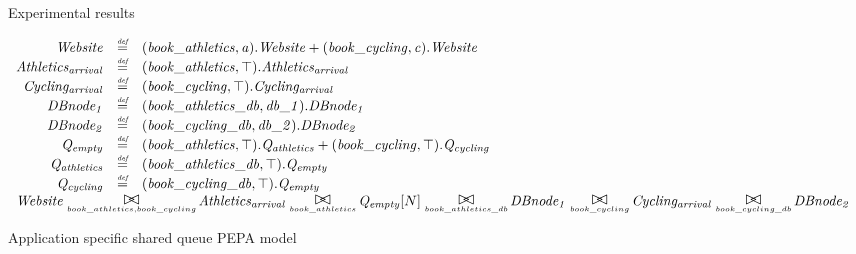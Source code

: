 \begin{figure}
	\caption{Experimental results}
	\centering
\end{figure}

\begin{figure}
	\caption{Application specific shared queue PEPA model}
	\centering
	\begin{displaymath}
	\begin{array}{rcl}
	\mathit{Website} & \rmdef & (\mathit{book\_athletics},\mathit{a}).\mathit{Website}+(\mathit{book\_cycling},\mathit{c}).\mathit{Website}\\
	\mathit{Athletics_{arrival}} & \rmdef & (\mathit{book\_athletics},\top).\mathit{Athletics_{arrival}}\\
	\mathit{Cycling_{arrival}} & \rmdef & (\mathit{book\_cycling},\top).\mathit{Cycling_{arrival}}\\
	\mathit{DBnode_1} & \rmdef & (\mathit{book\_athletics\_db},\mathit{db\_1}).\mathit{DBnode_1}\\
	\mathit{DBnode_2} & \rmdef & (\mathit{book\_cycling\_db},\mathit{db\_2}).\mathit{DBnode_2}\\
	\mathit{Q_{empty}} & \rmdef & (\mathit{book\_athletics},\top).\mathit{Q_{athletics}}+(\mathit{book\_cycling},\top).\mathit{Q_{cycling}}\\
	\mathit{Q_{athletics}} & \rmdef & (\mathit{book\_athletics\_db},\top).\mathit{Q_{empty}}\\
	\mathit{Q_{cycling}} & \rmdef & (\mathit{book\_cycling\_db},\top).\mathit{Q_{empty}}\\
	[0.0ex]		\multicolumn{3}{l}{\mathit{Website}\sync{book\_athletics,book\_cycling}\mathit{Athletics_{arrival}}\sync{book\_athletics}\mathit{Q_{empty}}[N]\sync{book\_athletics\_db}\mathit{DBnode_1}\sync{book\_cycling}\mathit{Cycling_{arrival}}\sync{book\_cycling\_db}\mathit{DBnode_2}}\\
	[0.0ex]	\end{array}
	\end{displaymath}
\end{figure}

